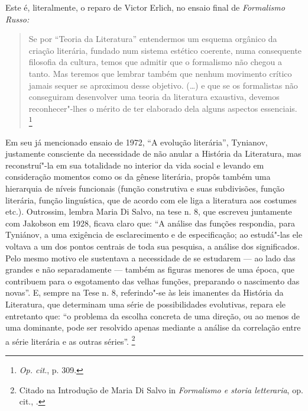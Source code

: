 Este é, literalmente, o reparo de Victor Erlich, no ensaio final de
\emph{Formalismo Russo:}

\begin{quote}
Se por ``Teoria da Literatura'' entendermos um esquema orgânico da
criação literária, fundado num sistema estético coerente, numa
consequente filosofia da cultura, temos que admitir que o formalismo não
chegou a tanto. Mas teremos que lembrar também que nenhum movimento
crítico jamais sequer se aproximou desse objetivo. (\ldots{}) e que se os
formalistas não conseguiram desenvolver uma teoria da literatura
exaustiva, devemos reconhecer"-lhes o mérito de ter elaborado dela alguns
aspectos essenciais. \footnote{\emph{Op. cit}., p. 309.}
\end{quote}

Em seu já mencionado ensaio de 1972, ``A evolução literária'', Tynianov,
justamente consciente da necessidade de não anular a História da
Literatura, mas reconstruí"-la em sua totalidade no interior da vida
social e levando em consideração momentos como os da gênese literária,
propôs também uma hierarquia de níveis funcionais (função construtiva e
suas subdivisões, função literária, função linguística, que de acordo
com ele liga a literatura aos costumes etc.). Outrossim, lembra Maria Di
Salvo, na tese n. 8, que escreveu juntamente com Jakobson em 1928,
ficava claro que: ``A análise das funções respondia, para Tyniánov, a
uma exigência de esclarecimento e de especificação; ao estudá"-las ele
voltava a um dos pontos centrais de toda sua pesquisa, a análise dos
significados. Pelo mesmo motivo ele sustentava a necessidade de se
estudarem --- ao lado das grandes e não separadamente --- também as figuras
menores de uma época, que contribuem para o esgotamento das velhas
funções, preparando o nascimento das novas''. E, sempre na Tese n. 8,
referindo"-se às leis imanentes da História da Literatura, que determinam
uma série de possibilidades evolutivas, repara ele entretanto que: ``o
problema da escolha concreta de uma direção, ou ao menos de uma
dominante, pode ser resolvido apenas mediante a análise da correlação
entre a série literária e as outras séries''.
\footnote{Citado na Introdução de Maria Di Salvo in \emph{Formalismo e
  storia letteraria}, op. cit., .}

